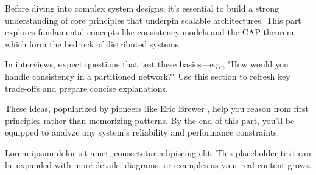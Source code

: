 
Before diving into complex system designs, it's essential to build a strong understanding of core principles that underpin scalable architectures. This part explores fundamental concepts like consistency models and the CAP theorem, which form the bedrock of distributed systems.

\begin{interviewtip}
In interviews, expect questions that test these basics—e.g., "How would you handle consistency in a partitioned network?" Use this section to refresh key trade-offs and prepare concise explanations.
\end{interviewtip}

These ideas, popularized by pioneers like Eric Brewer \cite{brewer2000}, help you reason from first principles rather than memorizing patterns. By the end of this part, you'll be equipped to analyze any system's reliability and performance constraints.

Lorem ipsum dolor sit amet, consectetur adipiscing elit. This placeholder text can be expanded with more details, diagrams, or examples as your real content grows.